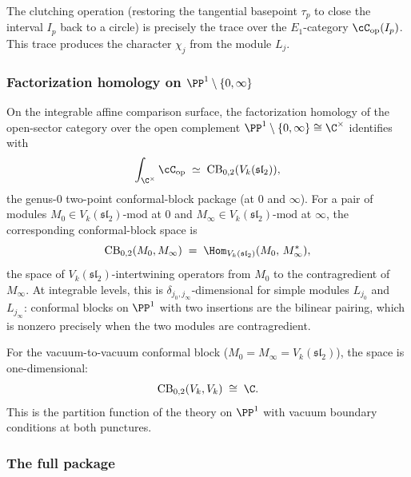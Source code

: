 The clutching operation (restoring the tangential basepoint
$\tau_p$ to close the interval $I_p$ back to a circle) is
precisely the trace over the $E_1$-category $\cC_{\mathrm{op}}(I_p)$.
This trace produces the character $\chi_j$ from the module $L_j$.


\subsubsection{Factorization homology on
 \texorpdfstring{$\PP^1 \setminus \{0,\infty\}$}{P\^1 - \{0, infty\}}}
\label{subsubsec:benchmark-factorization-homology}

On the integrable affine comparison surface, the factorization
homology of the open-sector category over the open complement
$\PP^1 \setminus \{0,\infty\} \cong \C^\times$ identifies with
\begin{equation}\label{eq:benchmark-factorization-homology}
 \int_{\C^\times} \cC_{\mathrm{op}}
 \;\simeq\;
 \mathrm{CB}_{0,2}(V_k(\mathfrak{sl}_2)),
\end{equation}
the genus-$0$ two-point conformal-block package
(at $0$ and $\infty$). For a pair of modules
$M_0 \in V_k(\mathfrak{sl}_2)\text{-mod}$ at $0$ and
$M_\infty \in V_k(\mathfrak{sl}_2)\text{-mod}$ at $\infty$,
the corresponding conformal-block space is
\begin{equation}\label{eq:benchmark-conformal-blocks}
 \mathrm{CB}_{0,2}(M_0, M_\infty)
 \;=\;
 \Hom_{V_k(\mathfrak{sl}_2)}(M_0,\, M_\infty^*),
\end{equation}
the space of $V_k(\mathfrak{sl}_2)$-intertwining operators
from $M_0$ to the contragredient of $M_\infty$. At integrable
levels, this is $\delta_{j_0, j_\infty}$-dimensional for simple
modules $L_{j_0}$ and $L_{j_\infty}$: conformal blocks on
$\PP^1$ with two insertions are the bilinear pairing, which is
nonzero precisely when the two modules are contragredient.

For the vacuum-to-vacuum conformal block
($M_0 = M_\infty = V_k(\mathfrak{sl}_2)$), the space is
one-dimensional:
\begin{equation}\label{eq:benchmark-vacuum-block}
 \mathrm{CB}_{0,2}(V_k, V_k) \;\cong\; \C.
\end{equation}
This is the partition function of the theory on $\PP^1$ with
vacuum boundary conditions at both punctures.


\subsubsection{The full package}
\label{subsubsec:benchmark-full-package}

